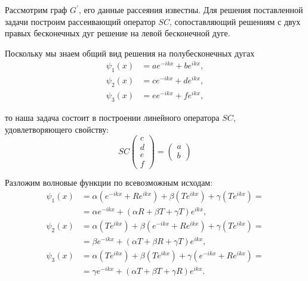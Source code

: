 \documentclass[a4 paper, 12 pt]{extarticle}
\begin{document}
   Рассмотрим граф $G^\prime$, его данные рассеяния известны. Для решения поставленной задачи построим рассеивающий оператор $SC$, сопоставляющий решениям с двух правых бесконечных дуг решение на левой бесконечной дуге.
   
   Поскольку мы знаем общий вид решения на полубесконечных дугах
   \begin{equation}
   \begin{split}
   \label{GeneralSolution1}
   \psi_1\left(x\right) &= a e^{-ikx} + b e^{ikx}, \\
   \psi_2\left(x\right) &= c e^{-ikx} + d e^{ikx}, \\
   \psi_3\left(x\right) &= e e^{-ikx} + f e^{ikx},
   \end{split}
   \end{equation}

   то наша задача состоит в построении линейного оператора $SC$, удовлетворяющего свойству:
   \[SC\left(
   \begin{array}{c}
   c \\
   d \\
   e \\
   f
   \end{array}\right) = \left(\begin{array}{c}
   a \\
   b
   \end{array}\right)\]
   
   Разложим волновые функции по всевозможным исходам:
   \begin{equation}
   \label{GeneralSolution2}
   \begin{aligned}
   \psi_1(x) &= \alpha\left(e^{-ikx} + Re^{ikx}\right) + \beta\left(Te^{ikx}\right) + \gamma \left(Te^{ikx}\right) = \\
   &= \alpha e^{-ikx} + \left(\alpha R + \beta T + \gamma T\right) e^{ikx}, \\
   \psi_2(x) &= \alpha \left(T e^{ikx}\right) + \beta \left(e^{-ikx} + R e^{ikx}\right) + \gamma \left(T e^{ikx}\right) = \\
   &= \beta e^{-ikx} + \left(\alpha T + \beta R + \gamma T\right) e^{ikx}, \\
   \psi_3(x) &= \alpha \left(T e^{ikx}\right) + \beta \left(T e^{ikx}\right) + \gamma \left(e^{-ikx} + R e^{ikx}\right) = \\
   &= \gamma e^{-ikx} + \left(\alpha T + \beta T + \gamma R\right) e^{ikx}.
   \end{aligned}
   \end{equation}
   
\end{document}
